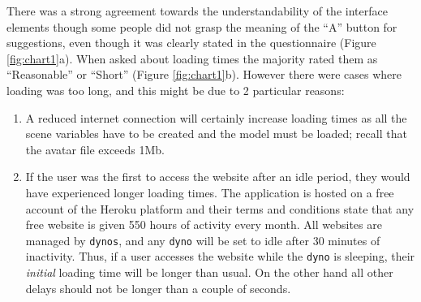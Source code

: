 \documentclass[12pt]{ociamthesis}  %
\begin{document}
There was a strong agreement towards the understandability of the interface elements though some people did not grasp the meaning of the ``A'' button for suggestions, even though it was clearly stated in the questionnaire (Figure \ref{fig:chart1}a). When asked about loading times the majority rated them as ``Reasonable'' or ``Short'' (Figure \ref{fig:chart1}b). However there were cases where loading was too long, and this might be due to 2 particular reasons:
\begin{enumerate}
	\item A reduced internet connection will certainly increase loading times as all the scene variables have to be created and the model must be loaded; recall that the avatar file exceeds 1Mb.
	\item If the user was the first to access the website after an idle period, they would have experienced longer loading times. The application is hosted on a free account of the Heroku platform and their terms and conditions state that any free website is given 550 hours of activity every month. All websites are managed by \texttt{dynos}, and any \texttt{dyno} will be set to idle after 30 minutes of inactivity. Thus, if a user accesses the website while the \texttt{dyno} is sleeping, their \textit{initial} loading time will be longer than usual. On the other hand all other delays should not be longer than a couple of seconds.
\end{enumerate}

\def\angle{-45}
\def\radius{2}
\def\cyclelist{{"bblue","rred","ggreen", "yyellow", "ppurple"}}
\newcount\cyclecount {}
\newcount\ind {}
\end{document}
